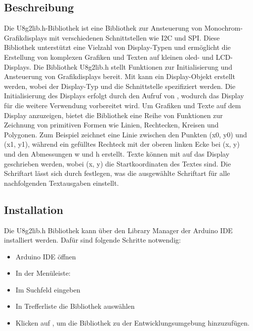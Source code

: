 \subsection{Beschreibung}
Die U8g2lib.h-Bibliothek ist eine Bibliothek zur Ansteuerung von Monochrom-Grafikdisplays mit verschiedenen Schnittstellen wie I2C und SPI. Diese Bibliothek unterstützt eine Vielzahl von Display-Typen und ermöglicht die Erstellung von komplexen Grafiken und Texten auf kleinen \ac{oled}- und LCD-Displays.
Die Bibliothek U8g2lib.h stellt Funktionen zur Initialisierung und Ansteuerung von Grafikdisplays bereit. Mit  kann ein Display-Objekt erstellt werden, wobei der Display-Typ und die Schnittstelle spezifiziert werden. Die Initialisierung des Displays erfolgt durch den Aufruf von , wodurch das Display für die weitere Verwendung vorbereitet wird.
Um Grafiken und Texte auf dem Display anzuzeigen, bietet die Bibliothek eine Reihe von Funktionen zur Zeichnung von primitiven Formen wie Linien, Rechtecken, Kreisen und Polygonen. Zum Beispiel zeichnet  eine Linie zwischen den Punkten (x0, y0) und (x1, y1), während  ein gefülltes Rechteck mit der oberen linken Ecke bei (x, y) und den Abmessungen w und h erstellt.
Texte können mit  auf das Display geschrieben werden, wobei (x, y) die Startkoordinaten des Textes sind. Die Schriftart lässt sich durch  festlegen, was die ausgewählte Schriftart für alle nachfolgenden Textausgaben einstellt.

\subsection{Installation}
Die U8g2lib.h Bibliothek kann über den Library Manager der Arduino IDE installiert werden. Dafür sind folgende Schritte notwendig:

\begin{itemize}
    \item Arduino IDE öffnen
    \item In der Menüleiste:  
    \item Im Suchfeld  eingeben
    \item In Trefferliste die Bibliothek  auswählen
    \item Klicken auf , um die Bibliothek zu der Entwicklungsumgebung hinzuzufügen.
\end{itemize}



